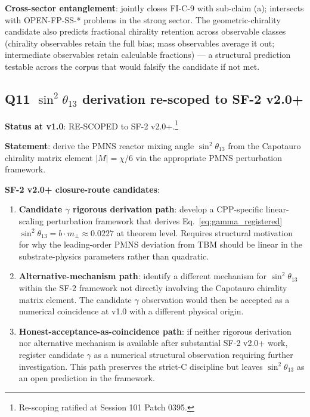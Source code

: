 \documentclass[11pt,letterpaper]{article}
\begin{document}
\textbf{Cross-sector entanglement}: jointly closes FI-C-9 with sub-claim (a); intersects with OPEN-FP-SS-* problems in the strong sector. The geometric-chirality candidate also predicts fractional chirality retention across observable classes (chirality observables retain the full bias; mass observables average it out; intermediate observables retain calculable fractions) --- a structural prediction testable across the corpus that would falsify the candidate if not met.

\subsection{Q11 $\sin^2\theta_{13}$ derivation re-scoped to SF-2 v2.0+}\label{sec:open_q11}

\textbf{Status at v1.0}: RE-SCOPED to SF-2 v2.0+.\footnote{Re-scoping ratified at Session 101 Patch 0395.}

\textbf{Statement}: derive the PMNS reactor mixing angle $\sin^2\theta_{13}$ from the Capotauro chirality matrix element $|M| = \chi/6$ via the appropriate PMNS perturbation framework.

\textbf{SF-2 v2.0+ closure-route candidates}:

\begin{enumerate}\setlength\itemsep{0.2em}
    \item \textbf{Candidate $\gamma$ rigorous derivation path}: develop a CPP-specific linear-scaling perturbation framework that derives Eq.~\eqref{eq:gamma_registered} $\sin^2\theta_{13} = b \cdot m_\perp \approx 0.0227$ at theorem level. Requires structural motivation for why the leading-order PMNS deviation from TBM should be linear in the substrate-physics parameters rather than quadratic.
    \item \textbf{Alternative-mechanism path}: identify a different mechanism for $\sin^2\theta_{13}$ within the SF-2 framework not directly involving the Capotauro chirality matrix element. The candidate $\gamma$ observation would then be accepted as a numerical coincidence at v1.0 with a different physical origin.
    \item \textbf{Honest-acceptance-as-coincidence path}: if neither rigorous derivation nor alternative mechanism is available after substantial SF-2 v2.0+ work, register candidate $\gamma$ as a numerical structural observation requiring further investigation. This path preserves the strict-C discipline but leaves $\sin^2\theta_{13}$ as an open prediction in the framework.
\end{enumerate}
\end{document}
